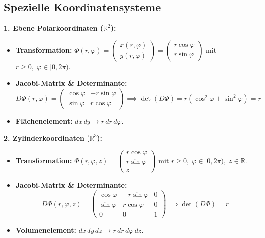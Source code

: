 \subsection{Spezielle Koordinatensysteme}

\begin{definition}
    \textbf{1. Ebene Polarkoordinaten ($\mathbb{R}^2$):}
    \begin{itemize}
        \item \textbf{Transformation:} $\Phi(r, \varphi) = \begin{pmatrix} x(r, \varphi) \\ y(r, \varphi) \end{pmatrix} = \begin{pmatrix} r \cos\varphi \\ r \sin\varphi \end{pmatrix}$ mit $r \ge 0, \; \varphi \in [0, 2\pi)$.
        \item \textbf{Jacobi-Matrix \& Determinante:}
        $$ D\Phi(r, \varphi) = \begin{pmatrix} \cos\varphi & -r \sin\varphi \\ \sin\varphi & r \cos\varphi \end{pmatrix} \implies \det(D\Phi) = r(\cos^2\varphi + \sin^2\varphi) = r $$
        \item \textbf{Flächenelement:} $dx \, dy \longrightarrow r \, dr \, d\varphi$.
    \end{itemize}
\end{definition}

\begin{definition}
    \textbf{2. Zylinderkoordinaten ($\mathbb{R}^3$):}
    \begin{itemize}
        \item \textbf{Transformation:} $\Phi(r, \varphi, z) = \begin{pmatrix} r \cos\varphi \\ r \sin\varphi \\ z \end{pmatrix}$ mit $r \ge 0, \; \varphi \in [0, 2\pi), \; z \in \mathbb{R}$.
        \item \textbf{Jacobi-Matrix \& Determinante:}
        $$ D\Phi(r, \varphi, z) = \begin{pmatrix} \cos\varphi & -r \sin\varphi & 0 \\ \sin\varphi & r \cos\varphi & 0 \\ 0 & 0 & 1 \end{pmatrix} \implies \det(D\Phi) = r $$
        \item \textbf{Volumenelement:} $dx \, dy \, dz \longrightarrow r \, dr \, d\varphi \, dz$.
    \end{itemize}
\end{definition}

